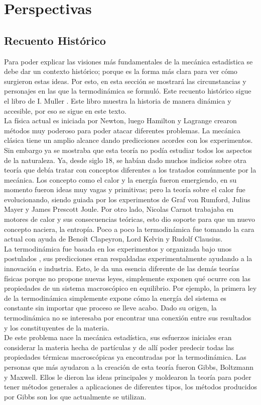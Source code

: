 \chapter{Perspectivas}



\section{Recuento Histórico}
Para poder explicar las visiones más fundamentales de la mecánica estadística se debe dar un contexto histórico; porque es la forma más clara para ver cómo surgieron estas ideas. Por esto, en esta sección se mostrará las circunstancias y personajes en las que la termodinámica se formuló. Este recuento histórico sigue el libro de I. Muller \cite{MullerHistory}. Este libro muestra la historia de manera dinámica y accesible, por eso se sigue en este texto.
\\
La física actual es iniciada por Newton, luego Hamilton y Lagrange crearon métodos muy poderoso para poder atacar diferentes problemas. La mecánica clásica tiene un amplio alcance dando predicciones acordes con los experimentos. Sin embargo ya se mostraba que esta teoría no podía estudiar todos los aspectos de la naturaleza. Ya, desde siglo 18, se habían dado muchos indicios sobre otra teoría que debía tratar con conceptos diferentes a los tratados comúnmente por la mecánica. Los concepto como el calor y la energía fueron emergiendo, en su momento fueron ideas muy vagas y primitivas; pero la teoría sobre el calor fue evolucionando, siendo guiada por los experimentos de Graf von Rumford, Julius Mayer y James Prescott Joule. Por otro lado, Nicolas Carnot trabajaba en motores de calor y sus consecuencias teóricas, esto dio soporte para que un nuevo concepto naciera, la entropía. Poco a poco la termodinámica fue tomando la cara actual con ayuda de Benoît Clapeyron, Lord Kelvin y Rudolf Clausius. 
\\
La termodinámica fue basada en los experimentos y organizada bajo unos postulados \cite{CallenThermo}, sus predicciones eran respaldadas experimentalmente ayudando a la innovación e industria. Esto, le da una esencia diferente de las demás teorías físicas porque no propone nuevas leyes, simplemente exponen qué ocurre con las propiedades de un sistema macroscópico en equilibrio. Por ejemplo, la primera ley de la termodinámica simplemente expone cómo la energía del sistema es constante sin importar que proceso se lleve acabo. Dado su origen, la termodinámica no se interesaba por encontrar una conexión entre sus resultados y los constituyentes de la materia.
\\
De este problema nace la mecánica estadística, sus esfuerzos iniciales eran considerar la materia hecha de partículas y de allí poder predecir todas las propiedades térmicas macroscópicas ya encontradas por la termodinámica. Las personas que más ayudaron a la creación de esta teoría fueron Gibbs, Boltzmann y Maxwell. Ellos le dieron las ideas principales y moldearon la teoría para poder tener métodos generales a aplicaciones de diferentes tipos, los métodos producidos por Gibbs son los que actualmente se utilizan.
\\
\\
